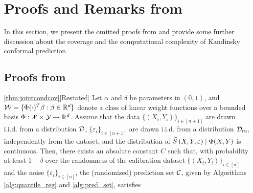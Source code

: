 \section{Proofs and Remarks from }
In this section, we present the omitted proofs from  and provide some further discussion about the coverage and the computational complexity of Kandinsky conformal prediction.

\subsection{Proofs from }
\label{sec: algorithm_app}
\begin{customthm}{\ref*{thm:jointcondcov}}[Restated]
    Let $\alpha$ and $\delta$ be parameters in $(0,1)$, and ${\cal W} = \{\Phi(\cdot)^T \beta :\beta \in \mathbb{R}^d\}$ denote a class of linear weight functions over a bounded basis $\Phi : {\cal X} \times {\cal Y} \to \mathbb{R}^d$. Assume that the data $\{(X_i,Y_i)\}_{i\in [n+1]}$ are drawn \mbox{i.i.d.} from a distribution ${\cal D}$, $\{\varepsilon_i\}_{i\in [n+1]}$ are drawn \mbox{i.i.d.} from a distribution ${\cal D}_{\text{rn}}$, independently from the dataset, and the distribution of ${\widetilde{S}}\left(X,Y, \varepsilon\right) \mid \Phi(X,Y)$ is continuous. Then, there exists an absolute constant $C$ such that, with probability at least $1-\delta$ over the randomness of the calibration dataset $\{(X_i,Y_i)\}_{i\in [n]}$ and the noise $\{\varepsilon_i\}_{i \in [n]}$, the (randomized) prediction set ${\cal C}$, given by Algorithms \ref{alg:quantile_reg} and \ref{alg:pred_set}, satisfies


\end{customthm}
